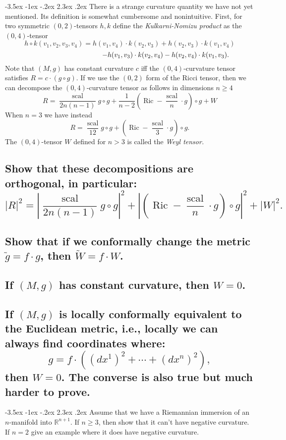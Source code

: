 \documentclass[10pt]{article}
\makeatletter
\renewcommand\section{\@startsection{section}{1}{\z@}%
                                  {-3.5ex \@plus -1ex \@minus -.2ex}%
                                  {2.3ex \@plus.2ex}%
                                  {\normalfont\large\bfseries}}
\newcommand{\R}{{\ensuremath{\mathbb{R}}} }
\DeclareMathOperator{\ric}{Ric}
\DeclareMathOperator{\scal}{scal}
\makeatother
\begin{document}
\section{There is a strange curvature quantity we have not yet mentioned. Its definition is somewhat cumbersome and nonintuitive. First, for two symmetric $(0,2)$-tensors $h,k$ define the \emph{Kulkarni-Nomizu product} as the $(0,4)$-tensor $$h \circ k(v_1, v_2, v_3, v_4) = h(v_1,v_4) \cdot k(v_2, v_3) + h(v_2, v_3) \cdot k(v_1, v_4)$$ $$\hspace{3.65cm}- h(v_1, v_3) \cdot k(v_2, v_4) -h(v_2, v_4) \cdot k(v_1, v_3).$$ Note that $(M, g)$ has constant curvature $c$ iff the $(0,4)$-curvature tensor satisfies $R = c \cdot (g \circ g)$. If we use the $(0,2)$ form of the Ricci tensor, then we can decompose the $(0,4)$-curvature tensor as follows in dimensions $n \geq 4$ $$R = \frac{\scal}{2n ( n-1)} g \circ g + \frac{1}{n-2} \left( \ric - \frac{\scal}{n} \cdot g \right) \circ g + W $$ When $n=3$ we have instead $$ R = \frac{\scal}{12} g \circ g + \left( \ric - \frac{\scal}{3} \cdot g \right) \circ g.$$ The $(0,4)$-tensor $W$ defined for $n > 3$ is called the \emph{Weyl tensor.}}
\subsection{Show that these decompositions are orthogonal, in particular: $$|R|^2 = \left| \frac{\scal}{2n ( n-1)} g \circ g \right| ^2  + \left| \left( \ric - \frac{\scal}{n} \cdot g \right) \circ g \right|^2 + |W|^2.$$}
\subsection{Show that if we conformally change the metric $\tilde{g} = f \cdot g$, then $\tilde{W} = f \cdot W$.}
\subsection{If $(M,g)$ has constant curvature, then $W=0$.}
\subsection{If $(M,g)$ is locally conformally equivalent to the Euclidean metric, i.e., locally we can always find coordinates where: $$g = f \cdot \left( (dx^1)^2 + \cdots + (dx^n)^2 \right), $$ then $W=0$. The converse is also true but much harder to prove.}



\section{Assume that we have a Riemannian immersion of an $n$-manifold into $\R^{n+1}$. If $n \geq 3$, then show that it can't have negative curvature. If $n=2$ give an example where it does have negative curvature.}
\end{document}
